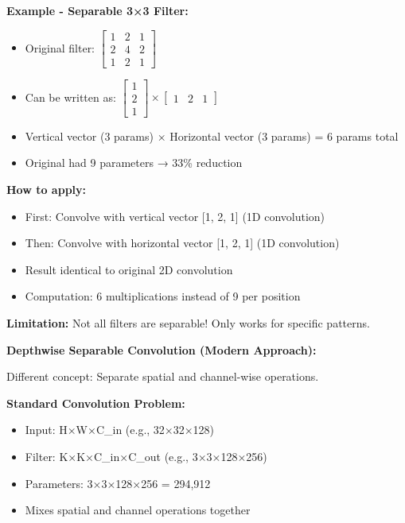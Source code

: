 \documentclass[12pt]{article}
\newcommand{\explanation}[1]{{\color{explanationcolor}#1}}
\begin{document}
\begin{enumerate}[(a)]
{{    \textbf{Example - Separable 3×3 Filter:}
    \begin{itemize}
        \item Original filter: 
        $\begin{bmatrix} 1 & 2 & 1 \\ 2 & 4 & 2 \\ 1 & 2 & 1 \end{bmatrix}$
        \item Can be written as: $\begin{bmatrix} 1 \\ 2 \\ 1 \end{bmatrix} \times \begin{bmatrix} 1 & 2 & 1 \end{bmatrix}$
        \item Vertical vector (3 params) × Horizontal vector (3 params) = 6 params total
        \item Original had 9 parameters → 33\% reduction
    \end{itemize}
    
    \textbf{How to apply:}
    \begin{itemize}
        \item First: Convolve with vertical vector [1, 2, 1] (1D convolution)
        \item Then: Convolve with horizontal vector [1, 2, 1] (1D convolution)
        \item Result identical to original 2D convolution
        \item Computation: 6 multiplications instead of 9 per position
    \end{itemize}
    
    \textbf{Limitation:} Not all filters are separable! Only works for specific patterns.
    }
    
    \textbf{Depthwise Separable Convolution (Modern Approach):}
    
    \explanation{
    Different concept: Separate spatial and channel-wise operations.
    
    \textbf{Standard Convolution Problem:}
    \begin{itemize}
        \item Input: H×W×C_in (e.g., 32×32×128)
        \item Filter: K×K×C_in×C_out (e.g., 3×3×128×256)
        \item Parameters: 3×3×128×256 = 294,912
        \item Mixes spatial and channel operations together
    \end{itemize}
    
}}
\end{enumerate}
\end{document}
